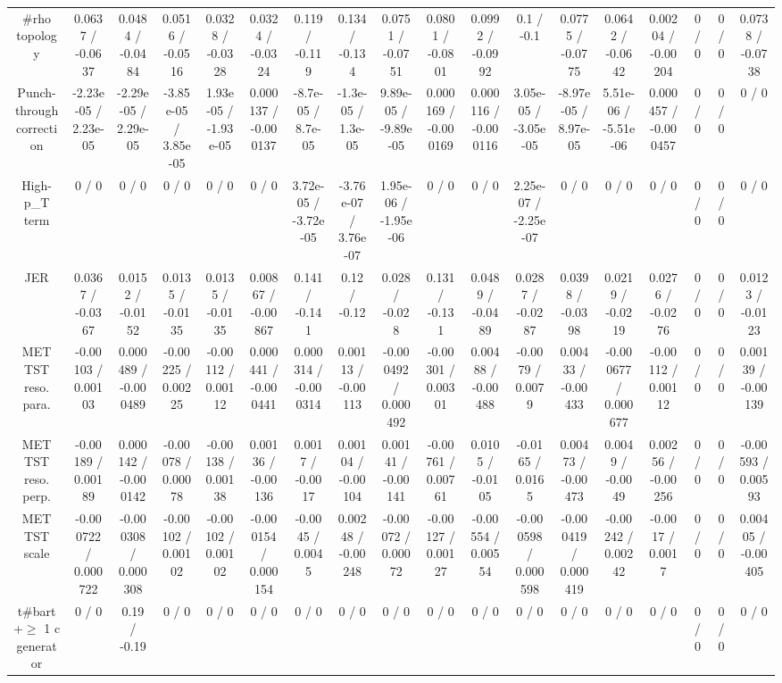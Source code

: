 \documentclass[10pt]{article}
\begin{document}
\begin{table}[htbp]
\begin{center}
\begin{tabular}{|c|c|c|c|c|c|c|c|c|c|c|c|c|c|c|c|c|c|}
  #rho topology & 0.0637 / -0.0637 & 0.0484 / -0.0484 & 0.0516 / -0.0516 & 0.0328 / -0.0328 & 0.0324 / -0.0324 & 0.119 / -0.119 & 0.134 / -0.134 & 0.0751 / -0.0751 & 0.0801 / -0.0801 & 0.0992 / -0.0992 & 0.1 / -0.1 & 0.0775 / -0.0775 & 0.0642 / -0.0642 & 0.00204 / -0.00204 & 0 / 0 & 0 / 0 & 0.0738 / -0.0738 \\ 
  Punch-through correction & -2.23e-05 / 2.23e-05 & -2.29e-05 / 2.29e-05 & -3.85e-05 / 3.85e-05 & 1.93e-05 / -1.93e-05 & 0.000137 / -0.000137 & -8.7e-05 / 8.7e-05 & -1.3e-05 / 1.3e-05 & 9.89e-05 / -9.89e-05 & 0.000169 / -0.000169 & 0.000116 / -0.000116 & 3.05e-05 / -3.05e-05 & -8.97e-05 / 8.97e-05 & 5.51e-06 / -5.51e-06 & 0.000457 / -0.000457 & 0 / 0 & 0 / 0 & 0 / 0 \\ 
  High-p_{T} term & 0 / 0 & 0 / 0 & 0 / 0 & 0 / 0 & 0 / 0 & 3.72e-05 / -3.72e-05 & -3.76e-07 / 3.76e-07 & 1.95e-06 / -1.95e-06 & 0 / 0 & 0 / 0 & 2.25e-07 / -2.25e-07 & 0 / 0 & 0 / 0 & 0 / 0 & 0 / 0 & 0 / 0 & 0 / 0 \\ 
  JER & 0.0367 / -0.0367 & 0.0152 / -0.0152 & 0.0135 / -0.0135 & 0.0135 / -0.0135 & 0.00867 / -0.00867 & 0.141 / -0.141 & 0.12 / -0.12 & 0.028 / -0.028 & 0.131 / -0.131 & 0.0489 / -0.0489 & 0.0287 / -0.0287 & 0.0398 / -0.0398 & 0.0219 / -0.0219 & 0.0276 / -0.0276 & 0 / 0 & 0 / 0 & 0.0123 / -0.0123 \\ 
  MET TST reso. para. & -0.00103 / 0.00103 & 0.000489 / -0.000489 & -0.00225 / 0.00225 & -0.00112 / 0.00112 & 0.000441 / -0.000441 & 0.000314 / -0.000314 & 0.00113 / -0.00113 & -0.000492 / 0.000492 & -0.00301 / 0.00301 & 0.00488 / -0.00488 & -0.0079 / 0.0079 & 0.00433 / -0.00433 & -0.000677 / 0.000677 & -0.00112 / 0.00112 & 0 / 0 & 0 / 0 & 0.00139 / -0.00139 \\ 
  MET TST reso. perp. & -0.00189 / 0.00189 & 0.000142 / -0.000142 & -0.00078 / 0.00078 & -0.00138 / 0.00138 & 0.00136 / -0.00136 & 0.0017 / -0.0017 & 0.00104 / -0.00104 & 0.00141 / -0.00141 & -0.00761 / 0.00761 & 0.0105 / -0.0105 & -0.0165 / 0.0165 & 0.00473 / -0.00473 & 0.0049 / -0.0049 & 0.00256 / -0.00256 & 0 / 0 & 0 / 0 & -0.00593 / 0.00593 \\ 
  MET TST scale & -0.000722 / 0.000722 & -0.000308 / 0.000308 & -0.00102 / 0.00102 & -0.00102 / 0.00102 & -0.000154 / 0.000154 & -0.0045 / 0.0045 & 0.00248 / -0.00248 & -0.00072 / 0.00072 & -0.00127 / 0.00127 & -0.00554 / 0.00554 & -0.000598 / 0.000598 & -0.000419 / 0.000419 & -0.00242 / 0.00242 & -0.0017 / 0.0017 & 0 / 0 & 0 / 0 & 0.00405 / -0.00405 \\ 
  t#bar{t}+$\geq$ 1 c generator & 0 / 0 & 0.19 / -0.19 & 0 / 0 & 0 / 0 & 0 / 0 & 0 / 0 & 0 / 0 & 0 / 0 & 0 / 0 & 0 / 0 & 0 / 0 & 0 / 0 & 0 / 0 & 0 / 0 & 0 / 0 & 0 / 0 & 0 / 0 \\ 

\end{tabular}
\end{center}
\end{table}
\end{document}
